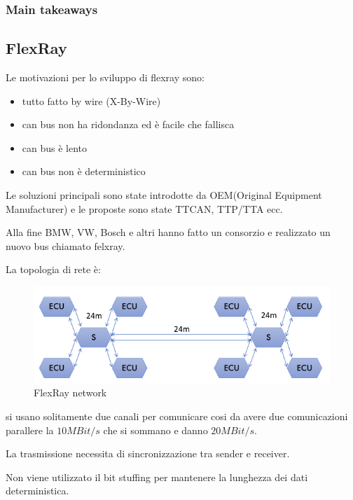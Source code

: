 \subsubsection{Main takeaways} %
\label{sec:Main takeaways}





\subsection{FlexRay} %
\label{sub:FlexRay}

Le motivazioni per lo sviluppo di flexray sono:
\begin{itemize}
  \item tutto fatto by wire (X-By-Wire)
  \item can bus non ha ridondanza ed è facile che fallisca
  \item can bus è lento
  \item can bus non è deterministico
\end{itemize}

Le soluzioni principali sono state introdotte da OEM(Original Equipment Manufacturer) e le proposte sono state TTCAN, TTP/TTA ecc.

Alla fine BMW, VW, Bosch e altri hanno fatto un consorzio e realizzato un nuovo bus chiamato felxray.

La topologia di rete è:

\begin{figure}[!ht]
  \begin{adjustbox}{width=0.5\columnwidth, center}
    \includegraphics{images/flexray.png}
  \end{adjustbox}
  \caption{FlexRay network}
  \label{fig:flexray_network}
\end{figure}

si usano solitamente due canali per comunicare cosi da avere due comunicazioni parallere la $10 MBit/s$ che si sommano e danno $20 MBit/s$.


La trasmissione necessita di sincronizzazione tra sender e receiver.

Non viene utilizzato il bit stuffing per mantenere la lunghezza dei dati deterministica.






